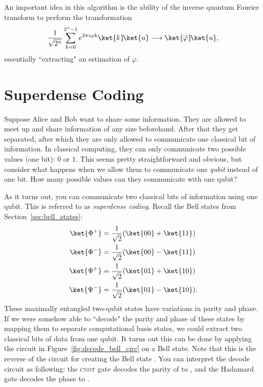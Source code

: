 \documentclass[11pt, notitlepage]{report}
\begin{document}
An important idea in this algorithm is the ability of the inverse quantum Fourier transform to perform the transformation
\begin{equation}
  \dfrac{1}{\sqrt{2^n}}\sum_{k=0}^{2^n-1} e^{2\pi i\varphi k}\ket{k}\!\ket{u} \longrightarrow \ket{\tilde{\varphi}}\!\ket{u},
\end{equation}
essentially ``extracting" an estimation \ket{\tilde{\varphi}} of $\varphi$.

\section{Superdense Coding}
Suppose Alice and Bob want to share some information. They are allowed to meet up and share information of any size beforehand. After that they get separated, after which they are only allowed to communicate one classical bit of information. In classical computing, they can only communicate two possible values (one bit): $0$ or $1$. This seems pretty straightforward and obvious, but consider what happens when we allow them to communicate one \emph{qubit} instead of one bit. How many possible values can they communicate with one qubit?

As it turns out, you can communicate two classical bits of information using one qubit. This is referred to as \emph{superdense coding}. Recall the Bell states from Section~\ref{sec:bell_states}:
\begin{align}
\ket{\Phi^+} &= \dfrac{1}{\sqrt2}(\ket{00} + \ket{11}) \\
\ket{\Phi^-} &= \dfrac{1}{\sqrt2}(\ket{00} - \ket{11}) \\
\ket{\Psi^+} &= \dfrac{1}{\sqrt2}(\ket{01} + \ket{10}) \\
\ket{\Psi^-} &= \dfrac{1}{\sqrt2}(\ket{01} - \ket{10}).
\end{align}
These maximally entangled two-qubit states have variations in parity and phase. If we were somehow able to ``decode" the parity and phase of these states by mapping them to separate computational basis states, we could extract two classical bits of data from one qubit. It turns out this can be done by applying the circuit in Figure~\ref{fig:decode_bell_circ} on a Bell state. Note that this is the reverse of the circuit for creating the Bell state \ket{\Phi^+}. You can interpret the decode circuit as following: the \textsc{cnot} gate decodes the parity of  to , and the Hadamard gate decodes the phase to .
\end{document}
